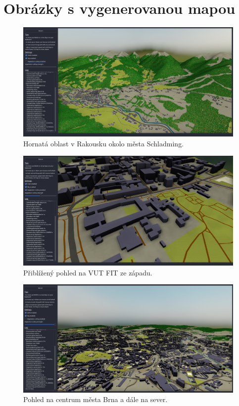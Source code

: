 


\chapter{Obrázky s vygenerovanou mapou}
\begin{figure}[H]
	\centering
	\includegraphics[width=40em]{images/results/schladming.png}
	\caption[caption]{Hornatá oblast v Rakousku okolo města Schladming.} 
	\label{img-austria}
\end{figure}

\begin{figure}[H]
	\centering
	\includegraphics[width=39em]{images/results/faculty.png}
	\caption[caption]{Přiblížený pohled na VUT FIT ze západu.} 
	\label{img-fit}
\end{figure}


\begin{figure}[H]
	\centering
	\includegraphics[width=39em]{images/results/brno.png}
	\caption[caption]{Pohled na centrum města Brna a dále na sever.} 
	\label{img-brno}
\end{figure}


